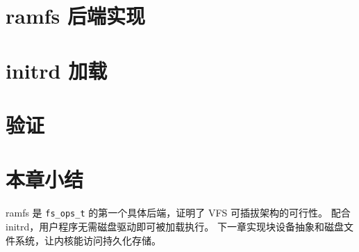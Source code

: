 \section{ramfs 后端实现}
\label{sec:ramfs-impl}


\section{initrd 加载}
\label{sec:ramfs-initrd}


\section{验证}
\label{sec:ramfs-verify}


\section{本章小结}

ramfs 是 \texttt{fs\_ops\_t} 的第一个具体后端，证明了 VFS 可插拔架构的可行性。
配合 initrd，用户程序无需磁盘驱动即可被加载执行。
下一章实现块设备抽象和磁盘文件系统，让内核能访问持久化存储。
